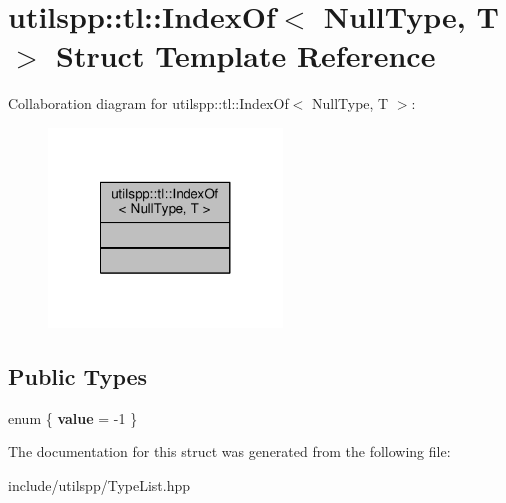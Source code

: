 \hypertarget{structutilspp_1_1tl_1_1IndexOf_3_01NullType_00_01T_01_4}{\section{utilspp\-:\-:tl\-:\-:Index\-Of$<$ Null\-Type, T $>$ Struct Template Reference}
\label{structutilspp_1_1tl_1_1IndexOf_3_01NullType_00_01T_01_4}
}


Collaboration diagram for utilspp\-:\-:tl\-:\-:Index\-Of$<$ Null\-Type, T $>$\-:\nopagebreak
\begin{figure}[H]
\begin{center}
\leavevmode
\includegraphics[width=176pt]{structutilspp_1_1tl_1_1IndexOf_3_01NullType_00_01T_01_4__coll__graph}
\end{center}
\end{figure}
\subsection*{Public Types}
\begin{DoxyCompactItemize}
\item 
enum \{ {\bfseries value} = -\/1
 \}
\end{DoxyCompactItemize}


The documentation for this struct was generated from the following file\-:\begin{DoxyCompactItemize}
\item 
include/utilspp/Type\-List.\-hpp\end{DoxyCompactItemize}
